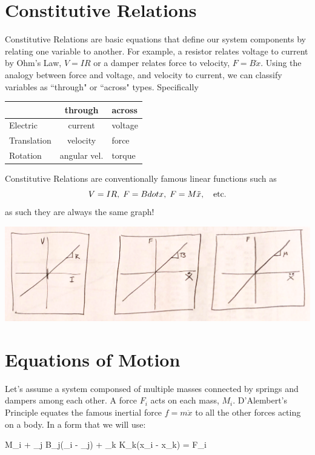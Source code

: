 \section{Constitutive Relations}
Constitutive Relations are basic equations that define our system components by relating one variable to another.  For example,
a resistor relates voltage to current by Ohm's Law, $V=IR$ or a damper relates force to velocity, $F=B\dot{x}$.   Using the
analogy between force and voltage, and velocity to current, we can classify variables as ``through" or ``across" types.  Specifically

\vspace{0.25in}
\begin{tabular}{l|c|l}
           & through & across\\ \hline
Electric   & current  & voltage \\
Translation & velocity & force \\
Rotation   & angular vel.  & torque
\end{tabular}

Constitutive Relations are conventionally famous linear  functions such as
 \[
 V=IR, \; F= B\\dot{x},\; F=M\ddot{x}, \quad \mathrm{etc.}
 \]
as such they are always the same graph!

\includegraphics[width=150mm]{figs02/Q68B24.png}



\section{Equations of Motion}

Let's assume a system componsed of multiple masses connected by springs and dampers among each other.   A force $F_i$ acts on each mass, $M_i$.   D'Alembert's Principle equates the famous inertial force $f=m\ddot{x}$ to all the other forces acting on a body.   In a form that we will use:

\bq\label{D'Alembert}
M_i  + \sum_j B_j(_i - _j) + \sum_k K_k(x_i - x_k) = F_i
\eq

